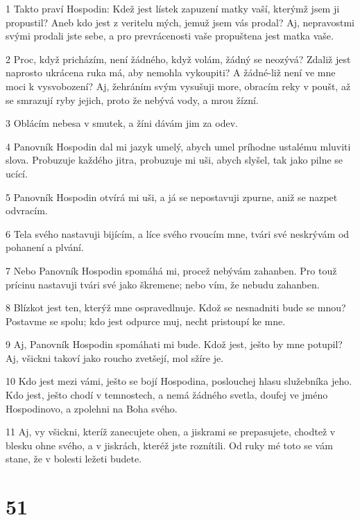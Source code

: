\par 1 Takto praví Hospodin: Kdež jest lístek zapuzení matky vaší, kterýmž jsem ji propustil? Aneb kdo jest z veritelu mých, jemuž jsem vás prodal? Aj, nepravostmi svými prodali jste sebe, a pro prevrácenosti vaše propuštena jest matka vaše.
\par 2 Proc, když pricházím, není žádného, když volám, žádný se neozývá? Zdaliž jest naprosto ukrácena ruka má, aby nemohla vykoupiti? A žádné-liž není ve mne moci k vysvobození? Aj, žehráním svým vysušuji more, obracím reky v poušt, až se smrazují ryby jejich, proto že nebývá vody, a mrou žízní.
\par 3 Oblácím nebesa v smutek, a žíni dávám jim za odev.
\par 4 Panovník Hospodin dal mi jazyk umelý, abych umel príhodne ustalému mluviti slova. Probuzuje každého jitra, probuzuje mi uši, abych slyšel, tak jako pilne se ucící.
\par 5 Panovník Hospodin otvírá mi uši, a já se nepostavuji zpurne, aniž se nazpet odvracím.
\par 6 Tela svého nastavuji bijícím, a líce svého rvoucím mne, tvári své neskrývám od pohanení a plvání.
\par 7 Nebo Panovník Hospodin spomáhá mi, procež nebývám zahanben. Pro touž prícinu nastavuji tvári své jako škremene; nebo vím, že nebudu zahanben.
\par 8 Blízkot jest ten, kterýž mne ospravedlnuje. Kdož se nesnadniti bude se mnou? Postavme se spolu; kdo jest odpurce muj, necht pristoupí ke mne.
\par 9 Aj, Panovník Hospodin spomáhati mi bude. Kdož jest, ješto by mne potupil? Aj, všickni takoví jako roucho zvetšejí, mol sžíre je.
\par 10 Kdo jest mezi vámi, ješto se bojí Hospodina, poslouchej hlasu služebníka jeho. Kdo jest, ješto chodí v temnostech, a nemá žádného svetla, doufej ve jméno Hospodinovo, a zpolehni na Boha svého.
\par 11 Aj, vy všickni, kteríž zanecujete ohen, a jiskrami se prepasujete, chodtež v blesku ohne svého, a v jiskrách, kteréž jste roznítili. Od ruky mé toto se vám stane, že v bolesti ležeti budete.

\chapter{51}

